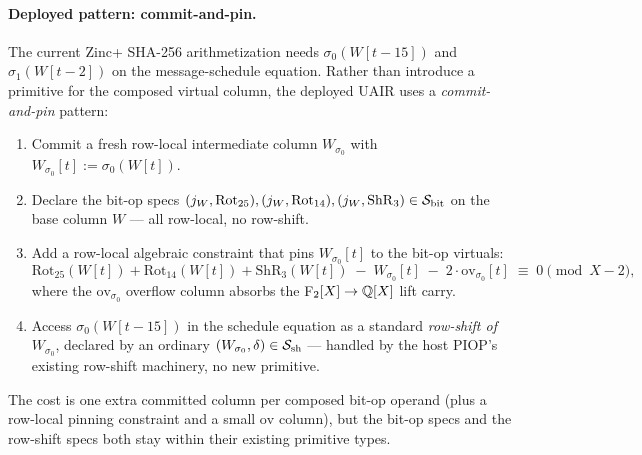 \paragraph{Deployed pattern: commit-and-pin.} The current Zinc+ SHA-256
arithmetization needs $\sigma_0(W[t-15])$ and $\sigma_1(W[t-2])$ on
the message-schedule equation. Rather than introduce a primitive for
the composed virtual column, the deployed UAIR uses a
\emph{commit-and-pin} pattern:
\begin{enumerate}[leftmargin=2em]
  \item Commit a fresh row-local intermediate column $W_{\sigma_0}$
    with $W_{\sigma_0}[t] := \sigma_0(W[t])$.
  \item Declare the bit-op specs
    $(j_W, \mathrm{Rot}_{25}), (j_W, \mathrm{Rot}_{14}), (j_W, \mathrm{ShR}_3) \in \mathcal{S}_{\mathrm{bit}}$
    on the base column $W$ — all row-local, no row-shift.
  \item Add a row-local algebraic constraint that pins $W_{\sigma_0}[t]$
    to the bit-op virtuals:
    \[
      \mathrm{Rot}_{25}(W[t]) + \mathrm{Rot}_{14}(W[t]) + \mathrm{ShR}_3(W[t])
      \;-\; W_{\sigma_0}[t] \;-\; 2\cdot\mathrm{ov}_{\sigma_0}[t] \;\equiv\; 0
      \pmod{X-2},
    \]
    where the $\mathrm{ov}_{\sigma_0}$ overflow column absorbs the
    F$_2[X] \to \mathbb{Q}[X]$ lift carry.
  \item Access $\sigma_0(W[t-15])$ in the schedule equation as a
    standard \emph{row-shift of $W_{\sigma_0}$}, declared by an
    ordinary $(W_{\sigma_0}, \delta) \in \mathcal{S}_{\mathrm{sh}}$ — handled by the host
    PIOP's existing row-shift machinery, no new primitive.
\end{enumerate}
The cost is one extra committed column per composed bit-op operand
(plus a row-local pinning constraint and a small $\mathrm{ov}$
column), but the bit-op specs and the row-shift specs both stay
within their existing primitive types.

